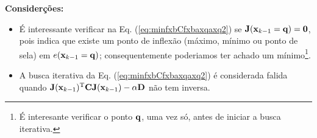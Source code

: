 \begin{theorem}
\textbf{Considerções:}

\begin{itemize}
\item É interessante verificar na Eq. (\ref{eq:minfxbCfxbaxqaxq2}) 
se  $\MATRIX{J}(\VECTOR{x}_{k-1}=\VECTOR{q}) = \MATRIX{0}$,
pois indica que existe um ponto de inflexão 
(máximo, mínimo ou ponto de sela) em $e(\VECTOR{x}_{k-1}=\VECTOR{q})$;
consequentemente poderiamos ter achado um mínimo\footnote{\label{foot:labq}É 
interesante verificar o ponto $\VECTOR{q}$, uma vez só, 
antes de iniciar a busca iterativa.}.
\item A busca iterativa da Eq. (\ref{eq:minfxbCfxbaxqaxq2}) é considerada falida quando 
$\MATRIX{J}(\VECTOR{x}_{k-1})^{\transpose}\MATRIX{C} \MATRIX{J}(\VECTOR{x}_{k-1}) -\alpha\MATRIX{D}$
não tem inversa.
\end{itemize}

\end{theorem} 

